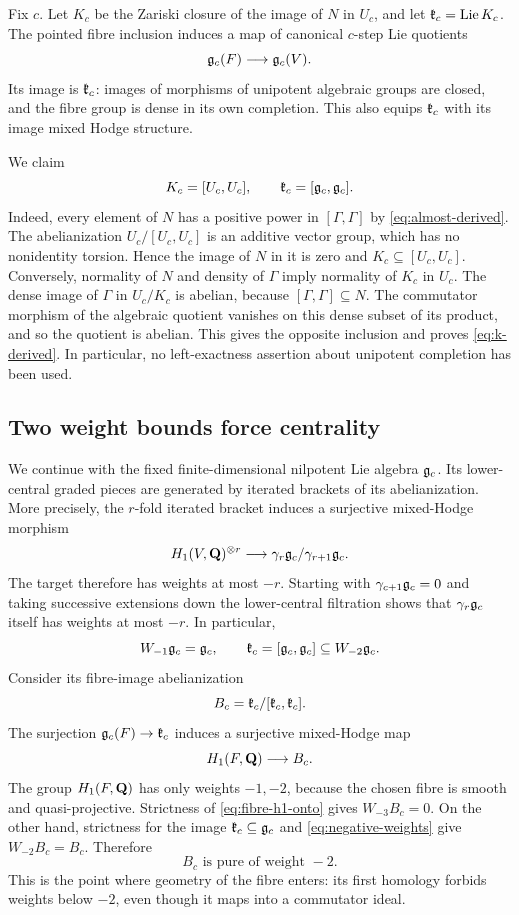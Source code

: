 Fix $c$. Let $K_c$ be the Zariski closure of the image of $N$ in $U_c$,
and let $\mathfrak k_c=\operatorname{Lie} K_c$. The pointed fibre inclusion induces a map of
canonical $c$-step Lie quotients
\[
 \mathfrak g_c(F)\longrightarrow\mathfrak g_c(V).
\]
Its image is $\mathfrak k_c$: images of morphisms of unipotent algebraic groups
are closed, and the fibre group is dense in its own completion. This
also equips $\mathfrak k_c$ with its image mixed Hodge structure.

We claim
\begin{equation}\label{eq:k-derived}
 K_c=[U_c,U_c],\qquad\mathfrak k_c=[\mathfrak g_c,\mathfrak g_c].
\end{equation}
Indeed, every element of $N$ has a positive power in $[\Gamma,\Gamma]$
by \eqref{eq:almost-derived}. The abelianization $U_c/[U_c,U_c]$ is an
additive vector group, which has no nonidentity torsion. Hence the image
of $N$ in it is zero and $K_c\subseteq[U_c,U_c]$. Conversely, normality
of $N$ and density of $\Gamma$ imply normality of $K_c$ in $U_c$. The
dense image of $\Gamma$ in $U_c/K_c$ is abelian, because
$[\Gamma,\Gamma]\subseteq N$. The commutator morphism of the algebraic
quotient vanishes on this dense subset of its product, and so the
quotient is abelian. This gives the opposite inclusion and proves
\eqref{eq:k-derived}. In particular, no left-exactness assertion about
unipotent completion has been used.

\subsection{Two weight bounds force centrality}
We continue with the fixed finite-dimensional nilpotent Lie algebra
$\mathfrak g_c$. Its lower-central graded pieces are generated by iterated
brackets of its abelianization. More precisely, the $r$-fold iterated
bracket induces a surjective mixed-Hodge morphism
\[
 H_1(V,\mathbf Q)^{\otimes r}\longrightarrow
 \gamma_r\mathfrak g_c/\gamma_{r+1}\mathfrak g_c.
\]
The target therefore has weights at most $-r$. Starting with
$\gamma_{c+1}\mathfrak g_c=0$ and taking successive extensions down the
lower-central filtration shows that $\gamma_r\mathfrak g_c$ itself has weights
at most $-r$. In particular,
\begin{equation}\label{eq:negative-weights}
 W_{-1}\mathfrak g_c=\mathfrak g_c,
 \qquad \mathfrak k_c=[\mathfrak g_c,\mathfrak g_c]\subseteq W_{-2}\mathfrak g_c.
\end{equation}
Consider its fibre-image abelianization
\[
 B_c=\mathfrak k_c/[\mathfrak k_c,\mathfrak k_c].
\]
The surjection $\mathfrak g_c(F)\to\mathfrak k_c$ induces a surjective mixed-Hodge map
\begin{equation}\label{eq:fibre-h1-onto}
 H_1(F,\mathbf Q)\longrightarrow B_c.
\end{equation}
The group $H_1(F,\mathbf Q)$ has only weights $-1,-2$, because the chosen fibre
is smooth and quasi-projective. Strictness of
\eqref{eq:fibre-h1-onto} gives $W_{-3}B_c=0$. On the other hand,
strictness for the image $\mathfrak k_c\subseteq\mathfrak g_c$ and
\eqref{eq:negative-weights} give $W_{-2}B_c=B_c$. Therefore
\begin{equation}\label{eq:pure-minus-two}
 B_c\text{ is pure of weight }-2.
\end{equation}
This is the point where geometry of the fibre enters: its first
homology forbids weights below $-2$, even though it maps into a
commutator ideal.

